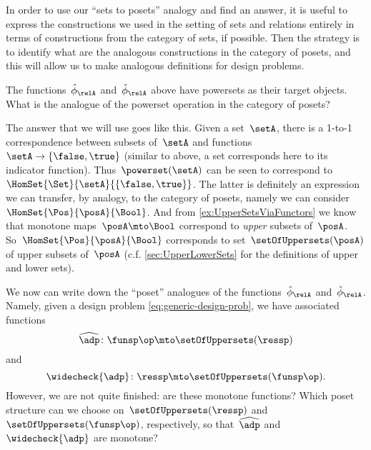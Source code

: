 In order to use our ``sets to posets'' analogy and find an answer, it is useful to express the constructions we used in the setting of sets and relations entirely in terms of constructions from the category of sets, if possible.
Then the strategy is to identify what are the analogous constructions in the category of posets, and this will allow us to make analogous definitions for design problems.

The functions~$\hat \phi_{\relA}$ and~$\check \phi_{\relA}$ above have powersets as their target objects.
What is the analogue of the powerset operation in the category of posets?

The answer that we will use goes like this.
Given a set~$\setA$, there is a 1-to-1 correspondence between subsets of~$\setA$ and functions~$\setA \to \{ \false, \true \}$ (similar to above, a set corresponds here to its indicator function).
Thus~$\powerset (\setA)$ can be seen to correspond to~$\HomSet{\Set}{\setA}{\{ \false, \true\}}$.
The latter is definitely an expression we can transfer, by analogy, to the category of posets, namely we can consider~$\HomSet{\Pos}{\posA}{\Bool}$.
And from \cref{ex:UpperSetsViaFunctors} we know that monotone maps~$\posA \mto \Bool$ correspond to \emph{upper} subsets of~$\posA$.
So~$\HomSet{\Pos}{\posA}{\Bool}$ corresponds to set~$\setOfUppersets (\posA)$ of upper subsets of~$\posA$ (c.f. \cref{sec:UpperLowerSets} for the definitions of upper and lower sets).

We now can write down the ``poset'' analogues of the functions~$\hat \phi_{\relA}$ and~$\check \phi_{\relA}$.
Namely, given a design problem \cref{eq:generic-design-prob}, we have associated functions
\begin{equation}
    \label{eq:dp-left-curry}
    \widehat{\adp} \colon \funsp\op \mto \setOfUppersets (\ressp)
\end{equation}
and
\begin{equation}
    \label{eq:dp-right-curry}
    \widecheck{\adp} \colon \ressp \mto \setOfUppersets (\funsp\op).
\end{equation}
However, we are not quite finished: are these monotone functions?
Which poset structure can we choose on~$\setOfUppersets (\ressp)$ and~$\setOfUppersets (\funsp\op)$, respectively, so that~$\widehat{\adp}$ and~$\widecheck{\adp}$ are monotone?

